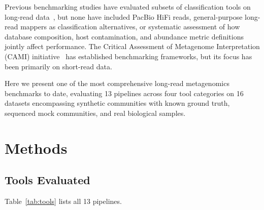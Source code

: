 \documentclass[11pt]{article}
\begin{document}
Previous benchmarking studies have evaluated subsets of classification tools on long-read data~\citep{pearman2020testing,sczyrba2017cami,ye2019benchmarking}, but none have included PacBio HiFi reads, general-purpose long-read mappers as classification alternatives, or systematic assessment of how database composition, host contamination, and abundance metric definitions jointly affect performance.  The Critical Assessment of Metagenome Interpretation (CAMI) initiative~\citep{sczyrba2017cami,sun2021challenges} has established benchmarking frameworks, but its focus has been primarily on short-read data.

Here we present one of the most comprehensive long-read metagenomics benchmarks to date, evaluating 13 pipelines across four tool categories on 16 datasets encompassing synthetic communities with known ground truth, sequenced mock communities, and real biological samples.

\section{Methods}

\subsection{Tools Evaluated}

Table~\ref{tab:tools} lists all 13 pipelines.
\end{document}
